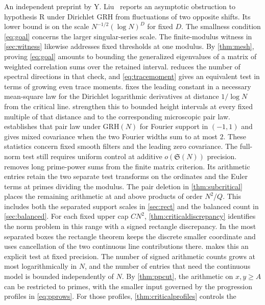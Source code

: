 \documentclass[11pt,a4paper]{article}
\numberwithin{equation}{section}
\newcommand{\SSS}{\mathfrak S}
\newcommand{\grh}{\mathrm{GRH}}
\begin{document}
An independent preprint by Y. Liu~\cite{YLiu} reports an asymptotic
obstruction to hypothesis R under Dirichlet GRH from fluctuations
of two opposite shifts. Its lower bound is on the scale
$N^{-1/2}(\log N)^D$ for fixed $D$. The smallness condition
\cref{eq:goal} concerns the larger singular-series scale. The
finite-modulus witness in \cref{sec:witness} likewise addresses
fixed thresholds at one modulus. By \cref{thm:mesh}, proving
\cref{eq:goal} amounts to bounding the generalized eigenvalues
of a matrix of weighted correlation sums over the retained
interval.  reduces the number of
spectral directions in that check, and \eqref{eq:tracemoment}
gives an equivalent test in terms of growing even trace moments.
 fixes the leading constant in a
necessary mean-square law for the Dirichlet logarithmic
derivatives at distance $1/\log N$ from the critical line.
 strengthen this
to bounded height intervals at every fixed multiple of that
distance and to the corresponding microscopic pair law.
 establishes that pair law
under $\grh(N)$ for Fourier support in $(-1,1)$ and gives
mixed covariance when the two Fourier widths sum to at
most $2$. These statistics concern fixed smooth filters
and the leading zero covariance. The full-norm test still
requires uniform control at additive $o(\SSS(N))$ precision.
 removes long prime-power sums from
the finite matrix criterion. Its arithmetic entries retain
the two separate test transforms on the ordinates and the
Euler terms at primes dividing the modulus.
The pair deletion in \cref{thm:subcritical} places
the remaining arithmetic at and above products of order
$N^2/Q$. This includes both the separated support scales in
\cref{sec:rect} and the balanced count in \cref{sec:balanced}.
For each fixed upper cap $CN^2$, \cref{thm:criticaldiscrepancy}
identifies the norm problem in this range with a signed rectangle
discrepancy. In the most separated boxes the rectangle theorem
keeps the discrete smaller coordinate and uses cancellation of the
two continuous line contributions there.
 makes this an explicit test at fixed precision.
The number of signed arithmetic counts grows at most logarithmically
in $N$, and the number of entries that need the continuous model
is bounded independently of $N$.
By \cref{thm:ppcut}, the arithmetic on $x,y\ge A$ can be
restricted to primes, with the smaller input governed by
the progression profiles in \cref{eq:pprows}.
For those profiles, \cref{thm:criticalprofiles} controls the
\end{document}
